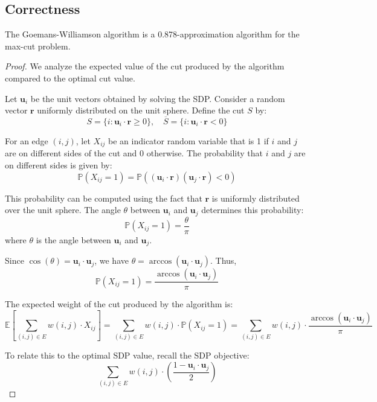 \subsection{Correctness}

\begin{theorem}
    \label{goemansWilliamson:approx}
    The Goemans-Williamson algorithm is a 0.878-approximation algorithm for the max-cut problem.
\end{theorem}

\begin{proof}

    We analyze the expected value of the cut produced by the algorithm compared to the optimal cut value.
    
    Let \( \mathbf{u}_i \) be the unit vectors obtained by solving the SDP. Consider a random vector \( \mathbf{r} \) uniformly distributed on the unit sphere. Define the cut \( S \) by:
    \[
    S = \{i \colon \mathbf{u}_i \cdot \mathbf{r} \geq 0\}, \quad \overline{S} = \{i \colon \mathbf{u}_i \cdot \mathbf{r} < 0\}
    \]
    
    For an edge \( (i, j) \), let \( X_{ij} \) be an indicator random variable that is 1 if \( i \) and \( j \) are on different sides of the cut and 0 otherwise. The probability that \( i \) and \( j \) are on different sides is given by:
    \[
    \mathbb{P}(X_{ij} = 1) = \mathbb{P}((\mathbf{u}_i \cdot \mathbf{r})(\mathbf{u}_j \cdot \mathbf{r}) < 0)
    \]
    
    This probability can be computed using the fact that \( \mathbf{r} \) is uniformly distributed over the unit sphere. The angle \( \theta \) between \( \mathbf{u}_i \) and \( \mathbf{u}_j \) determines this probability:
    \[
    \mathbb{P}(X_{ij} = 1) = \frac{\theta}{\pi}
    \]
    where \( \theta \) is the angle between \( \mathbf{u}_i \) and \( \mathbf{u}_j \).
    
    Since \( \cos(\theta) = \mathbf{u}_i \cdot \mathbf{u}_j \), we have \( \theta = \arccos(\mathbf{u}_i \cdot \mathbf{u}_j) \). Thus,
    \[
    \mathbb{P}(X_{ij} = 1) = \frac{\arccos(\mathbf{u}_i \cdot \mathbf{u}_j)}{\pi}
    \]
    
    The expected weight of the cut produced by the algorithm is:
    \[
    \mathbb{E}\left[\sum_{(i, j) \in E} w(i, j) \cdot X_{ij}\right] = \sum_{(i, j) \in E} w(i, j) \cdot \mathbb{P}(X_{ij} = 1) = \sum_{(i, j) \in E} w(i, j) \cdot \frac{\arccos(\mathbf{u}_i \cdot \mathbf{u}_j)}{\pi}
    \]
    
    To relate this to the optimal SDP value, recall the SDP objective:
    \[
    \sum_{(i, j) \in E} w(i, j) \cdot \left( \frac{1 - \mathbf{u}_i \cdot \mathbf{u}_j}{2} \right)
    \]
    

\end{proof}
